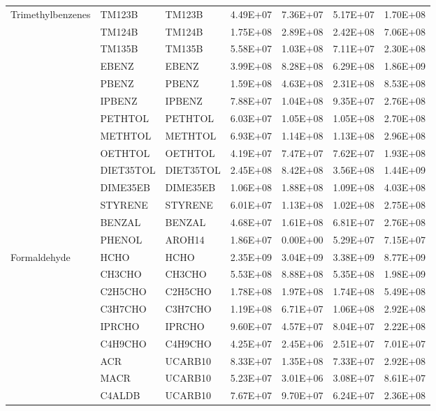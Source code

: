 \begin{longtable}{lllllll}
	\hline \multirow{3}{*}{Trimethylbenzenes} & TM123B & TM123B & 4.49E+07 & 7.36E+07 & 5.17E+07 & 1.70E+08 \\
	 & TM124B & TM124B & 1.75E+08 & 2.89E+08 & 2.42E+08 & 7.06E+08 \\
	 & TM135B & TM135B & 5.58E+07 & 1.03E+08 & 7.11E+07 & 2.30E+08 \\
	\hline \parbox[t]{2mm}{} & EBENZ & EBENZ & 3.99E+08 & 8.28E+08 & 6.29E+08 & 1.86E+09 \\
	 & PBENZ & PBENZ & 1.59E+08 & 4.63E+08 & 2.31E+08 & 8.53E+08 \\
	 & IPBENZ & IPBENZ & 7.88E+07 & 1.04E+08 & 9.35E+07 & 2.76E+08 \\
	 & PETHTOL & PETHTOL & 6.03E+07 & 1.05E+08 & 1.05E+08 & 2.70E+08 \\
	 & METHTOL & METHTOL & 6.93E+07 & 1.14E+08 & 1.13E+08 & 2.96E+08 \\
	 & OETHTOL & OETHTOL & 4.19E+07 & 7.47E+07 & 7.62E+07 & 1.93E+08 \\
	 & DIET35TOL & DIET35TOL & 2.45E+08 & 8.42E+08 & 3.56E+08 & 1.44E+09 \\
	 & DIME35EB & DIME35EB & 1.06E+08 & 1.88E+08 & 1.09E+08 & 4.03E+08 \\
	 & STYRENE & STYRENE & 6.01E+07 & 1.13E+08 & 1.02E+08 & 2.75E+08 \\
	 & BENZAL & BENZAL & 4.68E+07 & 1.61E+08 & 6.81E+07 & 2.76E+08 \\
	 & PHENOL & AROH14 & 1.86E+07 & 0.00E+00 & 5.29E+07 & 7.15E+07 \\
	\hline Formaldehyde & HCHO & HCHO & 2.35E+09 & 3.04E+09 & 3.38E+09 & 8.77E+09 \\ \hline
	\parbox[t]{2mm}{} & CH3CHO & CH3CHO & 5.53E+08 & 8.88E+08 & 5.35E+08 & 1.98E+09 \\
	 & C2H5CHO & C2H5CHO & 1.78E+08 & 1.97E+08 & 1.74E+08 & 5.49E+08 \\
	 & C3H7CHO & C3H7CHO & 1.19E+08 & 6.71E+07 & 1.06E+08 & 2.92E+08 \\
	 & IPRCHO & IPRCHO & 9.60E+07 & 4.57E+07 & 8.04E+07 & 2.22E+08 \\
	 & C4H9CHO & C4H9CHO & 4.25E+07 & 2.45E+06 & 2.51E+07 & 7.01E+07 \\
	 & ACR & UCARB10 & 8.33E+07 & 1.35E+08 & 7.33E+07 & 2.92E+08 \\
	 & MACR & UCARB10 & 5.23E+07 & 3.01E+06 & 3.08E+07 & 8.61E+07 \\
	 & C4ALDB & UCARB10 & 7.67E+07 & 9.70E+07 & 6.24E+07 & 2.36E+08 \\

\end{longtable}

